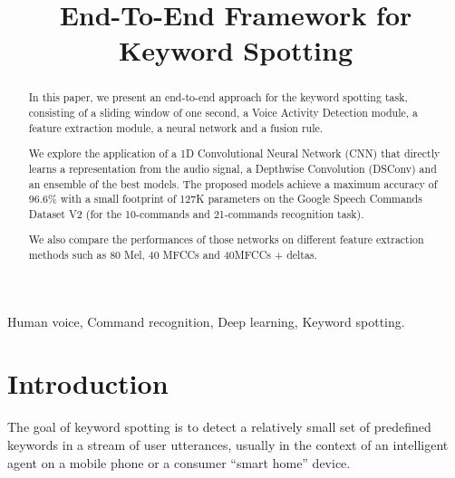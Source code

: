 \documentclass[conference]{IEEEtran}
\begin{document}
\title{End-To-End Framework for Keyword Spotting}
\author{
\and
{}
}

\maketitle

\begin{abstract}
In this paper, we present an end-to-end approach for the keyword spotting task, consisting of a sliding window of one second, a Voice Activity Detection module, a feature extraction module, a neural network and a fusion rule.

We explore the application of a 1D Convolutional Neural Network (CNN) that directly learns a representation from the audio signal, a Depthwise Convolution (DSConv) and an ensemble of the best models.
The proposed models achieve a maximum accuracy of 96.6\% with a small footprint of 127K parameters on the Google Speech Commands Dataset V2 (for the 10-commands and 21-commands recognition task).

We also compare the performances of those networks on different feature extraction methods such as 80 Mel, 40 MFCCs and 40MFCCs + deltas.
\end{abstract}

\IEEEpeerreviewmaketitle
\begin{IEEEkeywords}
Human voice, Command recognition, Deep learning, Keyword spotting.
\end{IEEEkeywords}

\section{Introduction}
The goal of keyword spotting is to detect a relatively small set of predefined keywords in a stream of user utterances, usually in the context of an intelligent agent on a mobile phone or a consumer “smart home” device.
\end{document}
